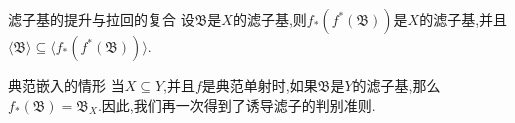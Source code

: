 \begin{proposition}{滤子基的提升与拉回的复合}{}
	设$\mathfrak{B}$是$X$的滤子基,则$f_{\ast}\left(f^{\ast}\left(\mathfrak{B}\right)\right)$是$X$的滤子基,并且$\langle\mathfrak{B}\rangle\subseteq\langle f_{\ast}\left(f^{\ast}\left(\mathfrak{B}\right)\right)\rangle$.
\end{proposition}

\begin{remark}{典范嵌入的情形}{}
	当$X\subseteq Y$,并且$f$是典范单射时,如果$\mathfrak{B}$是$Y$的滤子基,那么$f_{\ast}\left(\mathfrak{B}\right)=\mathfrak{B}_{X}$.因此,我们再一次得到了诱导滤子的判别准则.
\end{remark}
